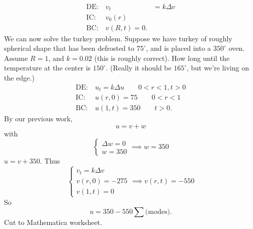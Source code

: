 \documentclass[cm]{article}
\begin{document}
\begin{align*}
\text{DE:}&~ v_t &= k \Delta v \\
\text{IC:}&~ v_0(r) \\
\text{BC:}&~ v(R,t) = 0.
\end{align*}
We can now  solve the turkey problem. Suppose we have turkey of roughly
spherical shape that has been defrosted to $75^{\circ}$, and is placed into a
$350^\circ$ oven. Assume $R = 1$, and $k = 0.02$ (this is roughly correct). How
long until the temperature at the center is $150^{\circ}$. (Really it should be
$165^{\circ}$, but we're living on the edge.)
\begin{align*}
\text{DE:}&~ u_t = k \Delta u \qquad 0 < r < 1, t > 0 \\
\text{IC:}&~ u(r,0) = 75 \qquad 0 < r < 1\\
\text{BC:}&~ u(1,t) = 350 \qquad t > 0.
\end{align*}
By our previous work,
$$u = v + w$$
with
$$\begin{cases} \Delta w = 0 \\ w = 350 \end{cases} \implies w = 350$$
$u = v + 350$. Thus
$$\begin{cases} v_t = k \Delta v \\  v(r,0) = -275 \\ v(1,t) = 0 \end{cases}
\implies v(r,t) = -550$$
So
$$u = 350 - 550 \sum \text{(modes)}.$$
Cut to Mathematica worksheet.
\end{document}
